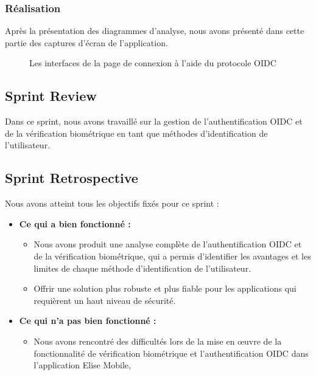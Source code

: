 \subsubsection{Réalisation}

Après la présentation des diagrammes d'analyse, nous avons présenté dans cette partie des captures d'écran de l'application.

\begin{figure}[H]
  \centering
  \caption{Les interfaces de la page de connexion à l'aide du protocole OIDC}
  \label{fig:realisation_OIDC}
\end{figure}

\subsection{Sprint Review}
Dans ce sprint, nous avons travaillé sur la gestion de l'authentification OIDC et de la vérification biométrique en tant que méthodes d'identification de l'utilisateur.
\subsection{Sprint Retrospective}
Nous avons atteint tous les objectifs fixés pour ce sprint :
\begin{itemize}
  \item \textbf{Ce qui a bien fonctionné :}
  \begin{itemize}
    \item Nous avons produit une analyse complète de l'authentification OIDC et de la vérification biométrique, qui a permis d'identifier les avantages et les limites de chaque méthode d'identification de l'utilisateur.
    \item Offrir une solution plus robuste et plus fiable pour les applications qui requièrent un haut niveau de sécurité.
    
  \end{itemize}

    \item \textbf{Ce qui n'a pas bien fonctionné :}
    \begin{itemize}
      \item Nous avons rencontré des difficultés lors de la mise en œuvre de la fonctionnalité de vérification biométrique et l'authentification OIDC dans l'application Elise Mobile,
    \end{itemize}
      
\end{itemize}
